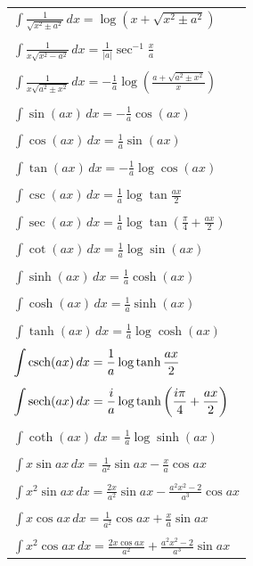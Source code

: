 \begin{longtable}{l}
  $\displaystyle \int \frac{1}{\sqrt{x^2 \pm a^2}}\,d x 
  = \log (x + \sqrt{x^2 \pm a^2})$ \\
  \\
  $\displaystyle \int \frac{1}{x \sqrt{x^2 - a^2}}\,d x 
  = \frac{1}{|a|} \sec^{-1} \frac{x}{a}$ \\
  \\
  $\displaystyle \int \frac{1}{x \sqrt{a^2 \pm x^2}}\,d x 
  = - \frac{1}{a} \log \left(
    \frac{a + \sqrt{a^2 \pm x^2}}{x} \right)$ \\
  \\
  $\displaystyle \int \sin(a x)\,d x = - \frac{1}{a} \cos (a x)$ \\
  \\
  $\displaystyle \int \cos(a x)\,d x = \frac{1}{a} \sin (a x)$ \\
  \\
  $\displaystyle \int \tan(a x)\,d x = - \frac{1}{a} \log \cos (a x)$ \\
  \\
  $\displaystyle \int \csc(a x)\,d x = \frac{1}{a} \log \tan \frac{a x}{2}$ \\
  \\
  $\displaystyle \int \sec(a x)\,d x 
  = \frac{1}{a} \log \tan \left( \frac{\pi}{4} + \frac{a x}{2}
  \right)$\\
  \\
  $\displaystyle \int \cot(a x)\,d x = \frac{1}{a} \log \sin (a x)$ \\
  \\
  $\displaystyle \int \sinh(a x)\,d x = \frac{1}{a} \cosh (a x)$ \\
  \\
  $\displaystyle \int \cosh(a x)\,d x = \frac{1}{a} \sinh (a x)$ \\
  \\
  $\displaystyle \int \tanh(a x)\,d x = \frac{1}{a} \log \cosh (a x)$ \\
  \\
  $\displaystyle \int \mathop{\mathrm{csch}}\nolimits(a x)\,d x = \frac{1}{a} \log \tanh \frac{a x}{2}$ \\
  \\
  $\displaystyle \int \mathop{\mathrm{sech}}\nolimits(a x)\,d x 
  = \frac{i}{a} \log \tanh \left( \frac{i \pi}{4} +
    \frac{a x}{2} \right)$ \\
  \\
  $\displaystyle \int \coth(a x)\,d x = \frac{1}{a} \log \sinh (a x)$ \\
  \\
  $\displaystyle \int x \sin a x\,d x 
  = \frac{1}{a^2} \sin a x - \frac{x}{a} \cos a x$ \\
  \\
  $\displaystyle \int x^2 \sin a x\,d x 
  = \frac{2x}{a^2} \sin a x - \frac{a^2 x^2-2}{a^3} \cos a x$ \\
  \\
  $\displaystyle \int x \cos a x\,d x 
  = \frac{1}{a^2} \cos a x + \frac{x}{a} \sin a x$ \\
  \\
  $\displaystyle \int x^2 \cos a x\,d x 
  = \frac{2x \cos a x}{a^2} + \frac{a^2 x^2 - 2}{a^3} \sin a x$
\end{longtable}
